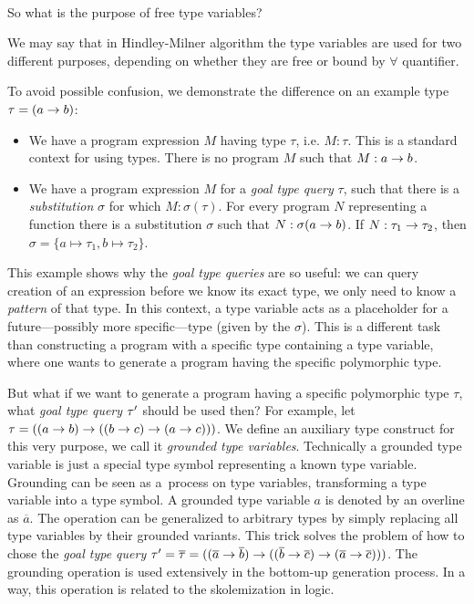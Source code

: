 \documentclass[a4paper,oneside]{memoir}
\begin{document}
~

So what is the purpose of free type variables?

We may say that in Hindley-Milner algorithm the type variables are used for two different purposes, depending on whether they are free or bound by $\forall$ quantifier.




To avoid possible confusion, we demonstrate the difference 
on an example type $\tau = (a \rightarrow b)$:
\begin{itemize}
\item We have a program expression $M$ having type $\tau$, i.e. $M : \tau$.
This is a standard context for using types.  There is no program $M$ such that $M : a \rightarrow b$.
\item We have a program expression $M$ for a \textit{goal type query} $\tau$,
such that there is a \textit{substitution} $\sigma$ for which $M : \sigma(\tau)$.
For every program $N$ representing a function
there is a substitution $\sigma$ such that $N : \sigma(a \rightarrow b)$.
If $N : \tau_1 \rightarrow \tau_2$, then $\sigma = \{a \mapsto \tau_1, b \mapsto \tau_2\}$.
\end{itemize}

This example shows why the \textit{goal type queries} are so useful: 
we can query creation of an expression before we know its
exact type, we only need to know a \textit{pattern} of that type. 
In this context, a type variable acts as a placeholder
for a future---possibly more specific---type (given by the $\sigma$). 
This is a different task than constructing a program with a specific type
containing a type variable, where one wants to generate 
a program having the specific polymorphic type.

But what if we want to generate a program having a specific polymorphic type $\tau$,
what \textit{goal type query} $\tau^\prime$ should be used then?
For example, let $\tau = ((a \rightarrow b) \rightarrow ((b \rightarrow c) \rightarrow (a \rightarrow c)))$.
We define an auxiliary type construct for this very purpose, we call it
\textit{grounded type variables}. 
Technically a grounded type variable is just a special type symbol
representing a known type variable.
Grounding can be seen as a~process on type variables, transforming
a type variable into a type symbol. 
A grounded type variable $a$ is denoted by an overline as $\overline{a}$.
The operation can be generalized to arbitrary types by simply replacing all type variables
by their grounded variants. This trick solves the problem of how to chose the
\textit{goal type query} $\tau^\prime = \overline{\tau} 
= ((\overline{a} \rightarrow \overline{b}) 
  \rightarrow ((\overline{b} \rightarrow \overline{c}) \rightarrow (\overline{a} \rightarrow \overline{c})))$.
The grounding operation is used extensively in the bottom-up generation process.
In a way, this operation is related to the skolemization in logic.
\end{document}
